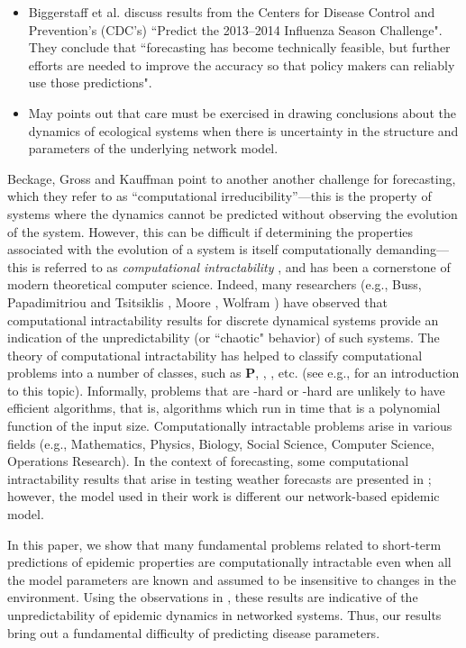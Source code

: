 \begin{itemize}
\item 
Biggerstaff et al. \cite{Biggerstaff-etal-2016} discuss results from 
the Centers for Disease Control and Prevention's (CDC's) ``Predict the
2013--2014 Influenza Season Challenge". 
They conclude that ``forecasting has become technically feasible, but
further efforts are needed to improve the accuracy so that policy makers can
reliably use those predictions".

\item
May \cite{May-2006} points out that care must be exercised in
drawing conclusions about the dynamics of ecological systems when
there is uncertainty in the structure and parameters of the 
underlying network model. 
\end{itemize}

Beckage, Gross and Kauffman \cite{beckage:ecosphere11} 
point to another another challenge
for forecasting, which they refer to as ``computational irreducibility''---this 
is the property of systems where
the dynamics cannot be predicted without observing the evolution of the system.
However, this can be difficult if determining the properties associated with
the evolution of a system is itself computationally demanding---this is referred to as 
\emph{computational intractability}
\cite{GJ-1979}, and has been a cornerstone of modern theoretical computer science.
Indeed, many researchers (e.g., Buss, Papadimitriou and Tsitsiklis \cite{Buss-etal-1991},
Moore \cite{Moore-1990}, Wolfram \cite{Wolfram-1985, Wolfram-1986})
have observed that computational intractability results for discrete
dynamical systems provide an indication of the unpredictability 
(or ``chaotic" behavior) of such systems.
The theory of computational intractability has helped 
to classify computational problems into a number of 
classes, such as \textbf{P}, \cnp, \cnump, etc. 
(see e.g., \cite{GJ-1979} for an introduction to this topic).
Informally, problems that are \cnp-hard or \cnump-hard are unlikely to 
have efficient algorithms, that is, algorithms
which run in time that is a polynomial function of the input size.
Computationally intractable problems arise in various fields 
(e.g., Mathematics, Physics, Biology, Social Science, Computer Science, 
Operations Research).  
In the context of forecasting,
some computational intractability results that arise in 
testing weather forecasts are presented in \cite{Fortnow-etal-2009};
however, the model used in their work is different our network-based
epidemic model. 

\medskip
In this paper, we show that many fundamental problems related to 
short-term predictions of epidemic properties
are computationally intractable  
even when all the model parameters are known and 
assumed to be insensitive to changes in the environment.
Using the observations in \cite{Buss-etal-1991,Wolfram-1985,Wolfram-1986,Moore-1990},
these results are indicative of the unpredictability of epidemic dynamics
in networked systems.
Thus, our results bring out a fundamental difficulty of 
predicting disease parameters. 

